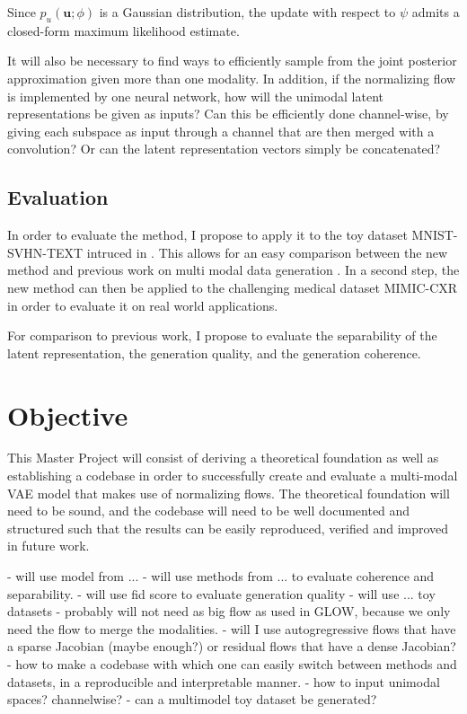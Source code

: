 \documentclass[english]{scrartcl}
\begin{document}
    Since $p_u(\textbf{u}; \phi)$ is a Gaussian distribution, the update with respect to $\psi$ admits a closed-form maximum likelihood estimate.

    It will also be necessary to find ways to efficiently sample from the joint posterior approximation given more than one modality.
    In addition, if the normalizing flow is implemented by one neural network, how will the unimodal latent representations be given as inputs?
    Can this be efficiently done channel-wise, by giving each subspace as input through a channel that are then merged with a convolution?
    Or can the latent representation vectors simply be concatenated?

    \subsection{Evaluation}
    In order to evaluate the method, I propose to apply it to the toy dataset MNIST-SVHN-TEXT intruced in \citet{shi_variational_2019}.
    This allows for an easy comparison between the new method and previous work on multi modal data generation \citep[MoPoE, MoE, PoE]{sutter_generalized_2020, shi_variational_2019, wu_multimodal_2018}.
    In a second step, the new method can then be applied to the challenging medical dataset MIMIC-CXR \citep{johnson_mimic-cxr-jpg_2019} in order to evaluate it on real world applications.

    For comparison to previous work, I propose to evaluate the separability of the latent representation, the generation quality, and the generation coherence.

    \section{Objective}
    This Master Project will consist of deriving a theoretical foundation as well as establishing a codebase in order to successfully create and evaluate a multi-modal VAE model that makes use of normalizing flows.
    The theoretical foundation will need to be sound, and the codebase will need to be well documented and structured such that the results can be easily reproduced, verified and improved in future work.


    - will use model from ...
    - will use methods from ... to evaluate coherence and separability.
    - will use fid score to evaluate generation quality
    - will use ... toy datasets
    - probably will not need as big flow as used in GLOW, because we only need the flow to merge the modalities.
    - will I use autogregressive flows that have a sparse Jacobian (maybe enough?) or residual flows that have a dense Jacobian?
    - how to make a codebase with which one can easily switch between methods and datasets, in a reproducible and interpretable manner.
    - how to input unimodal spaces? channelwise?
    - can a multimodel toy dataset be generated?



    \printbibliography
\end{document}

